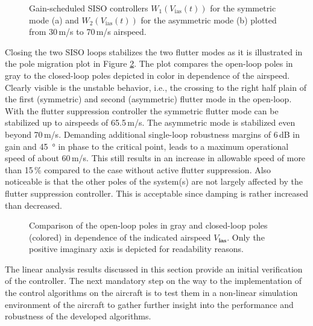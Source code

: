 \documentclass[aerospace,article,submit,moreauthors,pdftex,10pt,a4paper]{Definitions/mdpi}
\begin{document}
\begin{figure}[h]
	\centering
	
	\caption{Gain-scheduled \ac{SISO} controllers $W_{1}(V_{\text{ias}}(t))$ for the symmetric mode (a) and $W_{2}(V_{\text{ias}}(t))$ for the asymmetric mode (b) plotted from 30\,m/s to 70\,m/s airspeed.}
	\label{fig:sisoC}	
\end{figure}



Closing the two SISO loops stabilizes the two flutter modes as it is illustrated in the pole migration plot in Figure  \ref{fig:poles}. The plot compares the open-loop poles in gray to the closed-loop poles depicted in color in dependence of the airspeed. Clearly visible is the unstable behavior, i.e., the crossing to the right half plain of the first (symmetric) and second (asymmetric) flutter mode in the open-loop. With the flutter suppression controller the symmetric flutter mode can be stabilized up to airspeeds of 65.5\,m/s. The asymmetric mode is stabilized even beyond  70\,m/s. Demanding additional single-loop robustness margins of 6\,dB in gain and \SI{45}{\degree} in phase to the critical point, leads to a maximum operational speed of about 60\,m/s. This still results in an increase in allowable speed of more than 15\,\% compared to the case without active flutter suppression. Also noticeable is that the other poles of the system(s) are not largely affected by the flutter suppression controller. This is acceptable since damping is rather increased than decreased.


\begin{figure}[h]
	\centering
	
	\caption{Comparison of the open-loop poles in gray and closed-loop poles  (colored) in dependence of the indicated airspeed $V_{\textbf{ias}}$. Only the positive imaginary axis is depicted for readability reasons.}
	\label{fig:poles}	
\end{figure}

The  linear analysis results discussed in this section provide an initial verification of the controller. The next mandatory step on the way to the implementation of the control algorithms on the aircraft is to test them in a non-linear simulation environment of the aircraft to gather further insight into the performance and robustness of the developed algorithms.
 
\end{document}
